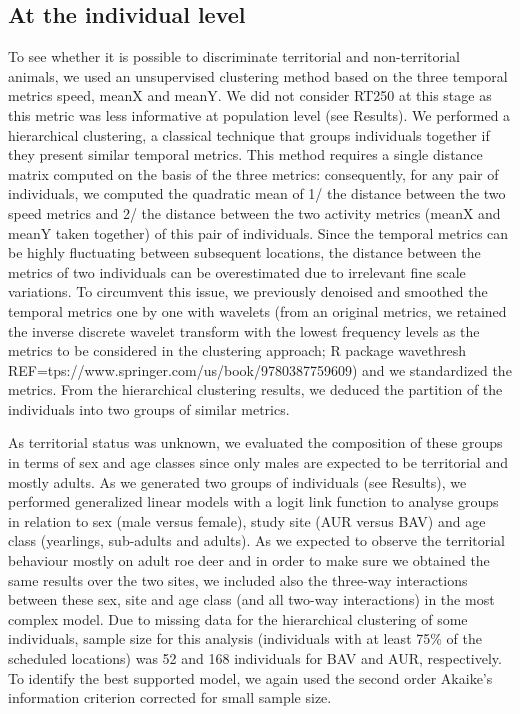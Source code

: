 \documentclass[a4paper,11pt]{article}
\begin{document}
\subsection*{At the individual level}
To see whether it is possible to discriminate territorial and
non-territorial animals, we used an unsupervised clustering method
based on the three temporal metrics speed, meanX and meanY. We did not
consider RT250 at this stage as this metric was less informative at
population level (see Results). We performed a hierarchical
clustering, a classical technique that groups individuals together if
they present similar temporal metrics. This method requires a single
distance matrix computed on the basis of the three metrics:
consequently, for any pair of individuals, we computed the quadratic
mean of 1/ the distance between the two speed metrics and 2/ the
distance between the two activity metrics (meanX and meanY taken
together) of this pair of individuals. Since the temporal metrics can
be highly fluctuating between subsequent locations, the distance
between the metrics of two individuals can be overestimated due to
irrelevant fine scale variations. To circumvent this issue, we
previously denoised and smoothed the temporal metrics one by one with
wavelets (from an original metrics, we retained the inverse discrete
wavelet transform with the lowest frequency levels as the metrics to
be considered in the clustering approach; R package
\textsf{wavethresh} REF=tps://www.springer.com/us/book/9780387759609)
and we standardized the metrics. From the hierarchical clustering
results, we deduced the partition of the individuals into two groups
of similar metrics.

As territorial status was unknown, we evaluated the composition of
these groups in terms of sex and age classes since only males are
expected to be territorial and mostly adults. As we generated two
groups of individuals (see Results), we performed generalized linear
models with a logit link function to analyse groups in relation to sex
(male versus female), study site (AUR versus BAV) and age class
(yearlings, sub-adults and adults). As we expected to observe the
territorial behaviour mostly on adult roe deer and in order to make
sure we obtained the same results over the two sites, we included also
the three-way interactions between these sex, site and age class (and
all two-way interactions) in the most complex model. Due to missing
data for the hierarchical clustering of some individuals, sample size
for this analysis (individuals with at least 75\% of the scheduled
locations) was 52 and 168 individuals for BAV and AUR,
respectively. To identify the best supported model, we again used the
second order Akaike’s information criterion corrected for small sample
size.
\end{document}
